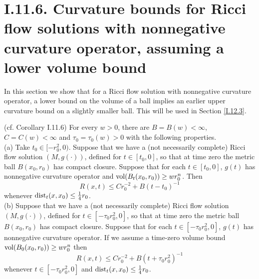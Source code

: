 \section{I.11.6. Curvature bounds for Ricci flow solutions with
nonnegative curvature operator, assuming a lower volume bound}

In this section we show that for a Ricci flow solution with nonnegative
curvature operator, a lower bound on the volume of a ball
implies an earlier upper curvature bound on a slightly smaller ball.
This will be used in Section \ref{I.12.3}.

\begin{corollary}
  \label{cor:kl-curvature-bounds-ricci-flow-solutions-nonnegative-curvature-operator-ass-existence-curvature-operators}
 (cf. Corollary I.11.6) \label{corI.11.6}
For every $w > 0$, there are $B = B(w) < \infty$, $C = C(w) < \infty$ and
$\tau_0 = \tau_0(w) > 0$ with the following properties. \\
(a) Take  $t_0 \in  [- r_0^2, 0)$.
Suppose that we have a (not necessarily complete) Ricci flow
solution $(M, g(\cdot))$, defined for $t \in [t_0, 0]$, so that at time zero
the metric ball $B(x_0, r_0)$ has compact closure. Suppose that
for each $t \in [t_0, 0]$,
$g(t)$ has nonnegative curvature operator and $\operatorname{vol}(B_t(x_0, r_0))
\ge w r_0^n$. Then
\begin{equation} \label{Rbound3}
R(x,t) \le C r_0^{-2} + B (t - t_0)^{-1}
\end{equation}
whenever
$\operatorname{dist}_t(x, x_0) \le \frac14 r_0$. \\
(b)
Suppose that we have a (not necessarily complete) Ricci flow
solution $(M, g(\cdot))$, defined for $t \in [- \tau_0 r_0^2, 0]$,
so that at time zero
the metric ball $B(x_0, r_0)$ has compact closure. Suppose that
for each $t \in [- \tau_0 r_0^2, 0]$,
$g(t)$ has nonnegative curvature operator.
If we assume a time-zero volume bound $\operatorname{vol}(B_0(x_0, r_0))
\ge w r_0^n$ then
\begin{equation}
R(x,t) \le C r_0^{-2} + B (t + \tau_0 r_0^2)^{-1}
\end{equation}
whenever $t \in [- \tau_0 r_0^2,0]$ and $\operatorname{dist}_t(x, x_0) \le \frac14 r_0$.
\end{corollary}
